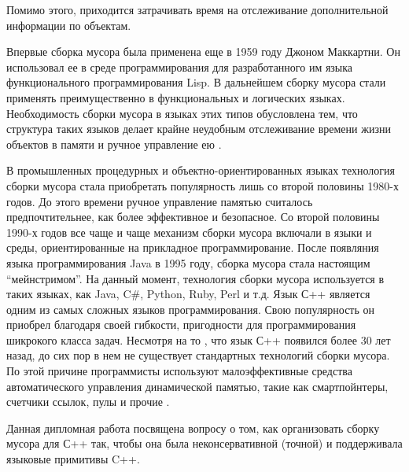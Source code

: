 \pagebreak

Помимо этого, приходится затрачивать время на отслеживание дополнительной информации по объектам.
 
Впервые сборка мусора была применена еще  в 1959 году Джоном Маккартни. Он использовал ее в среде программирования для разработанного им языка функционального программирования Lisp. В дальнейшем сборку мусора стали применять преимущественно в функциональных и логических языках. Необходимость сборки мусора в языках этих типов обусловлена тем, что структура таких языков делает крайне неудобным отслеживание времени жизни объектов в памяти и ручное управление ею .
 
В промышленных процедурных и объектно-ориентированных языках технология сборки мусора стала приобретать популярность лишь со второй половины 1980-х годов. До этого времени ручное управление памятью считалось предпочтительнее, как более эффективное и безопасное. Со второй половины 1990-х годов все чаще и чаще механизм сборки мусора включали в языки и среды, ориентированные на прикладное программирование. После появляния языка программирования Java в 1995 году, сборка мусора стала настоящим “мейнстримом”.  На данный момент, технология сборки мусора используется в таких языках, как Java, C\#, Python, Ruby, Perl и т.д.
Язык С++ является одним из самых сложных языков программирования. Свою популярность он приобрел благодаря своей гибкости, пригодности для программирования шикрокого класса задач. Несмотря на то , что язык С++ появился более 30 лет назад, до сих пор в нем не существует стандартных  технологий сборки мусора. По этой причине программисты используют  малоэффективные средства автоматического управления динамической памятью, такие как смартпойнтеры, счетчики ссылок, пулы и прочие .

Данная дипломная работа посвящена вопросу о том, как организовать сборку мусора для С++ так, чтобы она была неконсервативной (точной) и  поддерживала языковые примитивы C++.